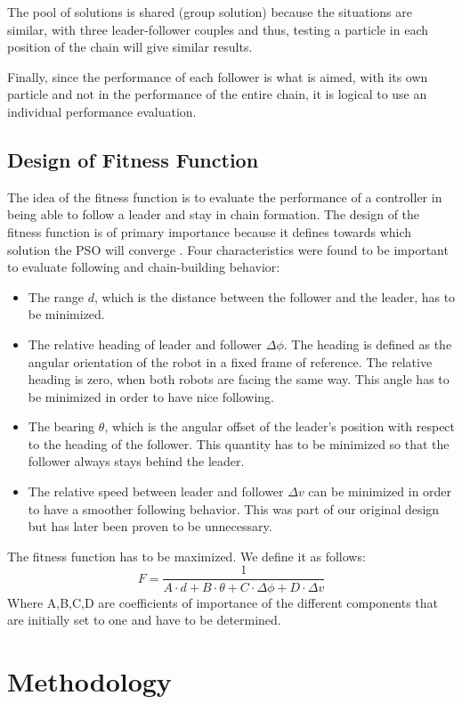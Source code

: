 \documentclass[a4paper, 10pt, conference]{ieeeconf}      %
\begin{document}
The pool of solutions is shared (group solution) because the situations are similar, with three leader-follower couples and thus, testing a particle in each position of the chain will give similar results.

Finally, since the performance of each follower is what is aimed, with its own particle and not in the performance of the entire chain, it is logical to use an individual performance evaluation.

\subsection{Design of Fitness Function}
The idea of the fitness function is to evaluate the performance of a controller in being able to follow a leader and stay in chain formation. The design of the fitness function is of primary importance because it defines towards which solution the PSO will converge \cite{c2}. Four characteristics were found to be important to evaluate following and chain-building behavior:
\begin{itemize}
\item The range $d$, which is the distance between the follower and the leader, has to be minimized.
\item The relative heading of leader and follower $\Delta \phi $. The heading is defined as the angular orientation of the robot in a fixed frame of reference. The relative heading is zero, when both robots are facing the same way. This angle has to be minimized in order to have nice following. 
\item The bearing $\theta $, which is the angular offset of the leader's position with respect to the heading of the follower. This quantity has to be minimized so that the follower always stays behind the leader.
\item The relative speed between leader and follower $\Delta v $ can be minimized in order to have a smoother following behavior. This was part of our original design but has later been proven to be unnecessary.
\end{itemize}
The fitness function has to be maximized. We define it as follows:
\begin{equation}\label{fitness}
F=\frac{1}{A \cdot d+B \cdot \theta+C \cdot \Delta \phi+D \cdot \Delta v}
\end{equation}
Where A,B,C,D are coefficients of importance of the different components that are initially set to one and have to be determined.

\section{Methodology}
                                  
\end{document}
